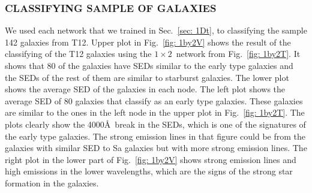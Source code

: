 \documentclass[useAMS,usenatbib]{mn2e}
\begin{document}
        \subsubsection{ CLASSIFYING SAMPLE OF GALAXIES}
         \label{sec: 1Dv}
            We used each network that we trained in Sec.~\ref{sec: 1Dt}, to classifying the sample 142 galaxies from T12.
            Upper plot in Fig.~\ref{fig: 1by2V} shows the result of the classifying of the T12 galaxies using the $1\times2$~network from Fig.~\ref{fig: 1by2T}.
            It shows that 80 of the galaxies have SEDs similar to the early type galaxies and the SEDs of the rest of them are similar to starburst galaxies.
            The lower plot shows the average SED of the galaxies in each node. 
            The left plot shows the average SED of 80 galaxies that classify as an early type galaxies. 
            These galaxies are similar to the ones in the left node in the upper plot in Fig.~\ref{fig: 1by2T}.
            The plots clearly show the 4000\AA~break in the SEDs, which is one of the signatures of the early type galaxies.
            The strong emission lines in that figure could be from the galaxies with similar SED to Sa galaxies but with more strong emission lines.
            The right plot in the lower part of Fig.~\ref{fig: 1by2V} shows strong emission lines and high emissions in the lower wavelengths, which are the signs of the strong star formation in the galaxies. 
\end{document}
